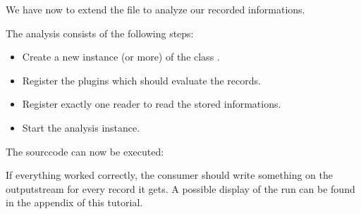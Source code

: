 		\setJavaCodeListing       
		

		We have now to extend the file  to analyze our recorded informations.

		\setJavaCodeListing       
		

		\notify The analysis consists of the following steps:
		\begin{itemize}
			\item Create a new instance (or more) of the class .
			\item Register the plugins which should evaluate the records.
			\item Register exactly one reader to read the stored informations.
			\item Start the analysis instance.
		\end{itemize}
		The sourccode can now be executed:

		\setBashListing 		
				

		If everything worked correctly, the consumer should write something on the outputstream for every record it gets. A possible display of the run can be found in the appendix of this tutorial. 